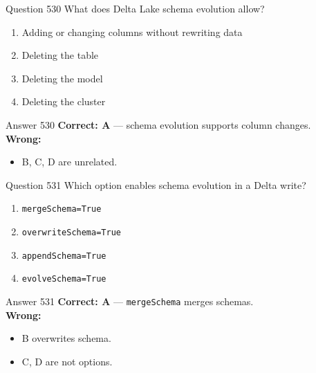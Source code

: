 \documentclass[aspectratio=169,11pt]{beamer}
\begin{document}
	\begin{frame}{Question 530}
		What does Delta Lake schema evolution allow?
		\begin{enumerate}[label=\Alph*.]
			\item Adding or changing columns without rewriting data
			\item Deleting the table
			\item Deleting the model
			\item Deleting the cluster
		\end{enumerate}
	\end{frame}
	\begin{frame}{Answer 530}
		\textbf{Correct: A} --- schema evolution supports column changes.\\
		\vspace{0.5em}
		\textbf{Wrong:}
		\begin{itemize}
			\item B, C, D are unrelated.
		\end{itemize}
	\end{frame}
	
	\begin{frame}{Question 531}
		Which option enables schema evolution in a Delta write?
		\begin{enumerate}[label=\Alph*.]
			\item \texttt{mergeSchema=True}
			\item \texttt{overwriteSchema=True}
			\item \texttt{appendSchema=True}
			\item \texttt{evolveSchema=True}
		\end{enumerate}
	\end{frame}
	\begin{frame}{Answer 531}
		\textbf{Correct: A} --- \texttt{mergeSchema} merges schemas.\\
		\vspace{0.5em}
		\textbf{Wrong:}
		\begin{itemize}
			\item B overwrites schema.
			\item C, D are not options.
		\end{itemize}
	\end{frame}
	
\end{document}
